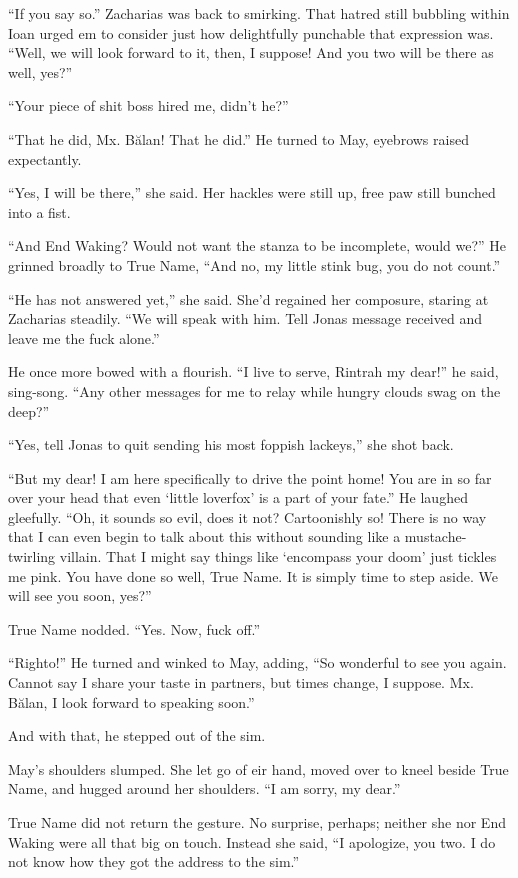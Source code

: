 ``If you say so.'' Zacharias was back to smirking. That hatred still bubbling within Ioan urged em to consider just how delightfully punchable that expression was. ``Well, we will look forward to it, then, I suppose! And you two will be there as well, yes?''

``Your piece of shit boss hired me, didn't he?''

``That he did, Mx. Bălan! That he did.'' He turned to May, eyebrows raised expectantly.

``Yes, I will be there,'' she said. Her hackles were still up, free paw still bunched into a fist.

``And End Waking? Would not want the stanza to be incomplete, would we?'' He grinned broadly to True Name, ``And no, my little stink bug, you do not count.''

``He has not answered yet,'' she said. She'd regained her composure, staring at Zacharias steadily. ``We will speak with him. Tell Jonas message received and leave me the fuck alone.''

He once more bowed with a flourish. ``I live to serve, Rintrah my dear!'' he said, sing-song. ``Any other messages for me to relay while hungry clouds swag on the deep?''

``Yes, tell Jonas to quit sending his most foppish lackeys,'' she shot back.

``But my dear! I am here specifically to drive the point home! You are in so far over your head that even `little loverfox' is a part of your fate.'' He laughed gleefully. ``Oh, it sounds so evil, does it not? Cartoonishly so! There is no way that I can even begin to talk about this without sounding like a mustache-twirling villain. That I might say things like `encompass your doom' just tickles me pink. You have done so well, True Name. It is simply time to step aside. We will see you soon, yes?''

True Name nodded. ``Yes. Now, fuck off.''

``Righto!'' He turned and winked to May, adding, ``So wonderful to see you again. Cannot say I share your taste in partners, but times change, I suppose. Mx. Bălan, I look forward to speaking soon.''

And with that, he stepped out of the sim.

May's shoulders slumped. She let go of eir hand, moved over to kneel beside True Name, and hugged around her shoulders. ``I am sorry, my dear.''

True Name did not return the gesture. No surprise, perhaps; neither she nor End Waking were all that big on touch. Instead she said, ``I apologize, you two. I do not know how they got the address to the sim.''


